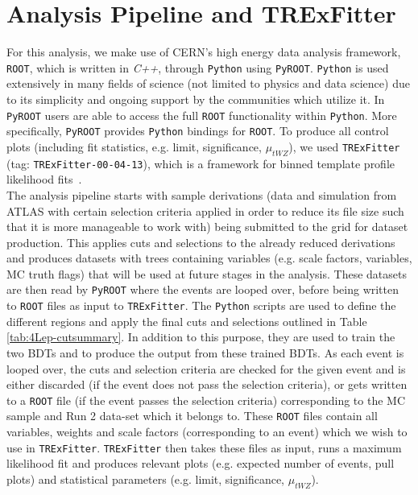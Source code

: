 \section{Analysis Pipeline and TRExFitter}
\label{sec:pipelineAnalysis-and-TRF}
For this analysis, we make use of CERN's high energy data analysis framework, \texttt{ROOT}, which is written in \textit{C++}, through \texttt{Python} using \texttt{PyROOT}. \texttt{Python} is used extensively in many fields of science (not limited to physics and data science) due to its simplicity and ongoing support by the communities which utilize it. In \texttt{PyROOT} users are able to access the full \texttt{ROOT} functionality within \texttt{Python}. More specifically, \texttt{PyROOT} provides \texttt{Python} bindings for \texttt{ROOT}. To produce all control plots (including fit statistics, e.g. limit, significance, $\mu_{tWZ}$), we used \texttt{TRExFitter} (tag: \texttt{TRExFitter-00-04-13}), which is a framework for binned template profile likelihood fits~\cite{TRexfitter}.\\

The analysis pipeline starts with sample derivations (data and simulation from ATLAS with certain selection criteria applied in order to reduce its file size such that it is more manageable to work with) being submitted to the grid for dataset production. This applies cuts and selections to the already reduced derivations and produces datasets with trees containing variables (e.g. scale factors, variables, MC truth flags) that will be used at future stages in the analysis. These datasets are then read by \texttt{PyROOT} where the events are looped over, before being written to \texttt{ROOT} files as input to \texttt{TRExFitter}. The \texttt{Python} scripts are used to define the different regions and apply the final cuts and selections outlined in Table \ref{tab:4Lep-cutsummary}. In addition to this purpose, they are used to train the two BDTs and to produce the output from these trained BDTs. As each event is looped over, the cuts and selection criteria are checked for the given event and is either discarded (if the event does not pass the selection criteria), or gets written to a \texttt{ROOT} file (if the event passes the selection criteria) corresponding to the MC sample and Run 2 data-set which it belongs to. These \texttt{ROOT} files contain all variables, weights and scale factors (corresponding to an event) which we wish to use in \texttt{TRExFitter}. \texttt{TRExFitter} then takes these files as input, runs a maximum likelihood fit and produces relevant plots (e.g. expected number of events, pull plots) and statistical parameters (e.g. limit, significance, $\mu_{tWZ}$).

